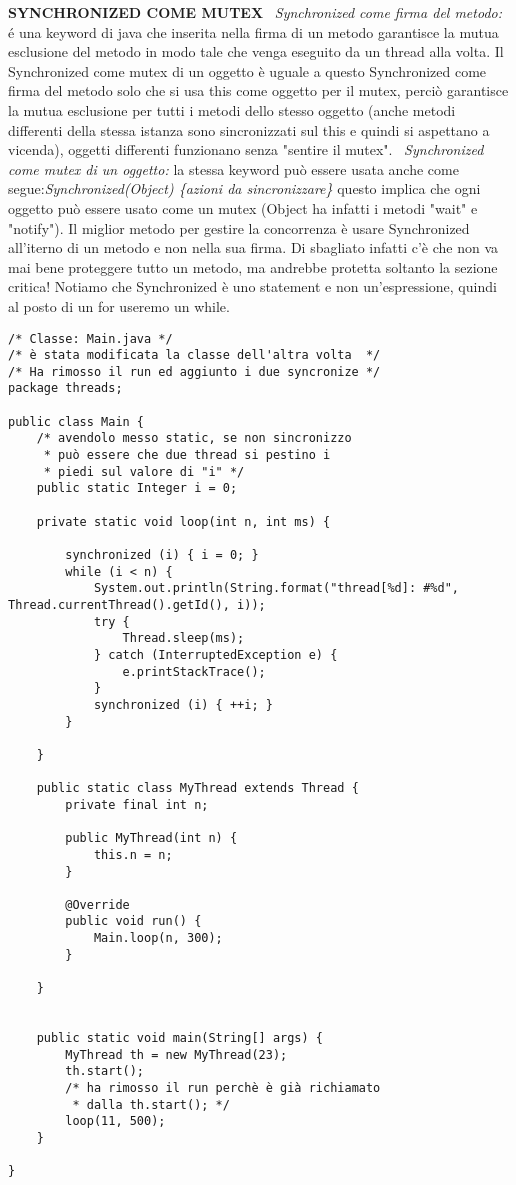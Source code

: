 \noindent \textbf{SYNCHRONIZED COME MUTEX} \newline
\textbullet\ \textit{Synchronized come firma del metodo:} é una keyword di java che inserita nella firma di un metodo garantisce la mutua esclusione del metodo in modo tale che venga eseguito da un thread alla volta. Il Synchronized come mutex di un oggetto è uguale a questo Synchronized come firma del metodo solo che si usa this come oggetto per il mutex, perciò garantisce la mutua esclusione per tutti i metodi dello stesso oggetto (anche metodi differenti della stessa istanza sono sincronizzati sul this e quindi si aspettano a vicenda), oggetti differenti funzionano senza "sentire il mutex".\newline
\textbullet\ \textit{Synchronized come mutex di un oggetto:} la stessa keyword può essere usata anche come segue:\textit{Synchronized(Object) \{azioni da sincronizzare\}} questo implica che ogni oggetto può essere usato come un mutex (Object ha infatti i metodi "wait" e "notify"). \newline
Il miglior metodo per gestire la concorrenza è usare Synchronized all'iterno di un metodo e non nella sua firma. \newline
Di sbagliato infatti c'è che non va mai bene proteggere tutto un metodo, ma andrebbe protetta soltanto la sezione critica!
Notiamo che Synchronized è uno statement e non un'espressione, quindi al posto di un for useremo un while.

\begin{lstlisting}[basicstyle=\small,]
/* Classe: Main.java */
/* è stata modificata la classe dell'altra volta  */
/* Ha rimosso il run ed aggiunto i due syncronize */
package threads;

public class Main {
	/* avendolo messo static, se non sincronizzo
	 * può essere che due thread si pestino i
	 * piedi sul valore di "i" */ 
    public static Integer i = 0;

    private static void loop(int n, int ms) {

        synchronized (i) { i = 0; }
        while (i < n) {
            System.out.println(String.format("thread[%d]: #%d", Thread.currentThread().getId(), i));
            try {
                Thread.sleep(ms);
            } catch (InterruptedException e) {
                e.printStackTrace();
            }
            synchronized (i) { ++i; }
        }

    }

    public static class MyThread extends Thread {
        private final int n;

        public MyThread(int n) {
            this.n = n;
        }

        @Override
        public void run() {
            Main.loop(n, 300);
        }

    }


    public static void main(String[] args) {
        MyThread th = new MyThread(23);
        th.start();
        /* ha rimosso il run perchè è già richiamato
         * dalla th.start(); */
        loop(11, 500);
    }

}
\end{lstlisting}


